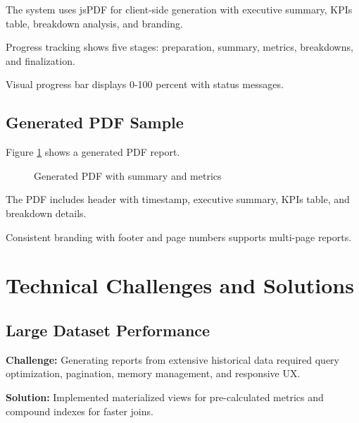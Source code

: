 The system uses jsPDF for client-side generation with executive summary, KPIs table, breakdown analysis, and branding.

Progress tracking shows five stages: preparation, summary, metrics, breakdowns, and finalization.

Visual progress bar displays 0-100 percent with status messages.

\subsection{Generated PDF Sample}

Figure \ref{fig:sprint5-impl6} shows a generated PDF report.

\begin{figure}[H]
\centering
{}
\caption{Generated PDF with summary and metrics}
\label{fig:sprint5-impl6}
\end{figure}

The PDF includes header with timestamp, executive summary, KPIs table, and breakdown details.

Consistent branding with footer and page numbers supports multi-page reports.

\section{Technical Challenges and Solutions}

\subsection{Large Dataset Performance}

\textbf{Challenge:} Generating reports from extensive historical data required query optimization, pagination, memory management, and responsive UX.

\textbf{Solution:} Implemented materialized views for pre-calculated metrics and compound indexes for faster joins.

